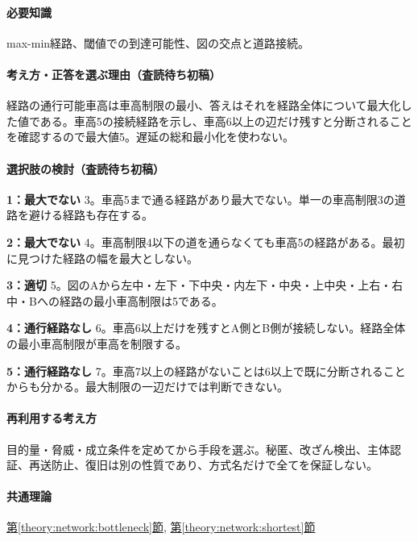 \paragraph{必要知識} max-min経路、閾値での到達可能性、図の交点と道路接続。

\paragraph{考え方・正答を選ぶ理由（査読待ち初稿）} 経路の通行可能車高は車高制限の最小、答えはそれを経路全体について最大化した値である。車高5の接続経路を示し、車高6以上の辺だけ残すと分断されることを確認するので最大値5。遅延の総和最小化を使わない。

\paragraph{選択肢の検討（査読待ち初稿）}\mbox{}\par

\noindent\textbf{1：最大でない} 3。車高5まで通る経路があり最大でない。単一の車高制限3の道路を避ける経路も存在する。\par

\noindent\textbf{2：最大でない} 4。車高制限4以下の道を通らなくても車高5の経路がある。最初に見つけた経路の幅を最大としない。\par

\noindent\textbf{3：適切} 5。図のAから左中・左下・下中央・内左下・中央・上中央・上右・右中・Bへの経路の最小車高制限は5である。\par

\noindent\textbf{4：通行経路なし} 6。車高6以上だけを残すとA側とB側が接続しない。経路全体の最小車高制限が車高を制限する。\par

\noindent\textbf{5：通行経路なし} 7。車高7以上の経路がないことは6以上で既に分断されることからも分かる。最大制限の一辺だけでは判断できない。\par

\paragraph{再利用する考え方} 目的量・脅威・成立条件を定めてから手段を選ぶ。秘匿、改ざん検出、主体認証、再送防止、復旧は別の性質であり、方式名だけで全てを保証しない。

\paragraph{共通理論} \hyperref[theory:network:bottleneck]{第\ref*{theory:network:bottleneck}節}, \hyperref[theory:network:shortest]{第\ref*{theory:network:shortest}節}

